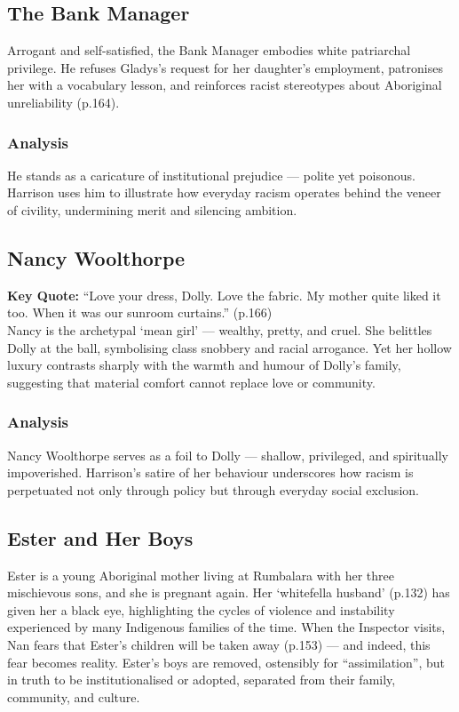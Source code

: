 \documentclass[a4paper]{article}
\begin{document}
\subsection{The Bank Manager}
Arrogant and self-satisfied, the Bank Manager embodies white patriarchal privilege. He refuses Gladys’s request for her daughter’s employment, patronises her with a vocabulary lesson, and reinforces racist stereotypes about Aboriginal unreliability (p.164).\\

\subsubsection{Analysis}
He stands as a caricature of institutional prejudice — polite yet poisonous. Harrison uses him to illustrate how everyday racism operates behind the veneer of civility, undermining merit and silencing ambition.\\

\subsection{Nancy Woolthorpe}
\textbf{Key Quote:} ``Love your dress, Dolly. Love the fabric. My mother quite liked it too. When it was our sunroom curtains.'' (p.166)\\

Nancy is the archetypal ‘mean girl’ — wealthy, pretty, and cruel. She belittles Dolly at the ball, symbolising class snobbery and racial arrogance. Yet her hollow luxury contrasts sharply with the warmth and humour of Dolly’s family, suggesting that material comfort cannot replace love or community.\\

\subsubsection{Analysis}
Nancy Woolthorpe serves as a foil to Dolly — shallow, privileged, and spiritually impoverished. Harrison’s satire of her behaviour underscores how racism is perpetuated not only through policy but through everyday social exclusion.\\

\subsection{Ester and Her Boys}
Ester is a young Aboriginal mother living at Rumbalara with her three mischievous sons, and she is pregnant again. Her ‘whitefella husband’ (p.132) has given her a black eye, highlighting the cycles of violence and instability experienced by many Indigenous families of the time. When the Inspector visits, Nan fears that Ester’s children will be taken away (p.153) — and indeed, this fear becomes reality. Ester’s boys are removed, ostensibly for “assimilation”, but in truth to be institutionalised or adopted, separated from their family, community, and culture.\\
\end{document}
